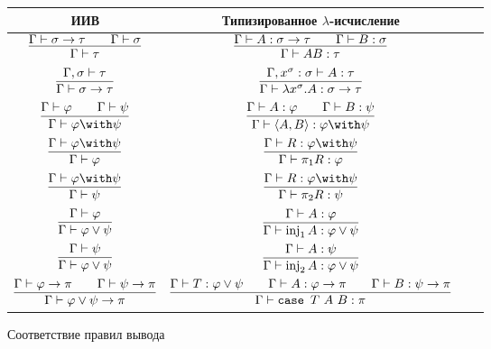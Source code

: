 \begin{figure}
\centering
\begin{tabular}{Sc@{\hspace{1.5cm}} Sc} \toprule
    ИИВ & Типизированное $\lambda$-исчисление \\ \midrule

    $\infer{\Gamma \vdash \tau}{\Gamma \vdash \sigma \rightarrow \tau && \Gamma \vdash \sigma}$ &
    $\infer{\Gamma \vdash AB : \tau}{\Gamma \vdash A : \sigma \rightarrow \tau && \Gamma \vdash B : \sigma}$ \\ \addlinespace

    $\infer{\Gamma \vdash \sigma \rightarrow \tau}{\Gamma, \sigma \vdash \tau}$ &
    $\infer{\Gamma \vdash \lambda x^\sigma . A : \sigma \rightarrow \tau}{\Gamma, x^\sigma : \sigma \vdash A : \tau}$ \\ \midrule

    $\infer{\Gamma \vdash \varphi \with \psi}{\Gamma \vdash \varphi && \Gamma \vdash \psi}$ &
    $\infer{\Gamma \vdash \left<A,B\right> : \varphi \with \psi}{\Gamma \vdash A : \varphi && \Gamma \vdash B : \psi}$ \\ \addlinespace

    $\infer{\Gamma \vdash \varphi}{\Gamma \vdash \varphi \with \psi}$ &
    $\infer{\Gamma \vdash \pi_1 R : \varphi}{\Gamma \vdash R : \varphi \with \psi}$ \\ \addlinespace

    $\infer{\Gamma \vdash \psi}{\Gamma \vdash \varphi \with \psi}$ &
    $\infer{\Gamma \vdash \pi_2 R : \psi}{\Gamma \vdash R : \varphi \with \psi}$ \\ \midrule

    $\infer{\Gamma \vdash \varphi \vee \psi}{\Gamma \vdash \varphi}$ &
    $\infer{\Gamma \vdash \inj_1 A : \varphi \vee \psi}{\Gamma \vdash A : \varphi}$ \\ \addlinespace

    $\infer{\Gamma \vdash \varphi \vee \psi}{\Gamma \vdash \psi}$ &
    $\infer{\Gamma \vdash \inj_2 A : \varphi \vee \psi}{\Gamma \vdash A : \psi}$ \\ \addlinespace

    $\infer{\Gamma \vdash \varphi \vee \psi \rightarrow \pi}
        {\Gamma \vdash \varphi \rightarrow \pi && \Gamma \vdash \psi \rightarrow \pi}$ &
    $\infer{\Gamma \vdash \case{T}{A}{B} : \pi}{\Gamma \vdash T : \varphi \vee \psi &&
        \Gamma \vdash A : \varphi \rightarrow \pi && \Gamma \vdash B : \psi \rightarrow \pi}$ \\ \bottomrule
\end{tabular}
\captionsetup{labelformat=empty}
\caption{Соответствие правил вывода}
\end{figure}


